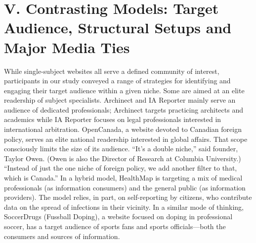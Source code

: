 \chapter{V. Contrasting Models: Target Audience, Structural Setups and Major Media Ties}
While single-subject websites all serve a defined community of interest,
participants in our study conveyed a range of strategies for identifying and
engaging their target audience within a given niche. Some are aimed at an
elite readership of subject specialists. Archinect and IA Reporter mainly
serve an audience of dedicated professionals; Archinect targets practicing
architects and academics while IA Reporter focuses on legal professionals
interested in international arbitration. OpenCanada, a website devoted to
Canadian foreign policy, serves an elite national readership interested in
global affairs. That scope consciously limits the size of its audience.
``It’s a double niche,'' said founder, Taylor Owen. (Owen is also the Director
of Research at Columbia University.) ``Instead of just the one niche of foreign
policy, we add another filter to that, which is Canada.''
In a hybrid model, HealthMap is targeting a mix of medical professionals
(as information consumers) and the general public (as information providers).
The model relies, in part, on self-reporting by citizens, who contribute
data on the spread of infections in their vicinity. In a similar mode of thinking,
SoccerDrugs (Fussball Doping), a website focused on doping in professional
soccer, has a target audience of sports fans and sports officials—both
the consumers and sources of information.

